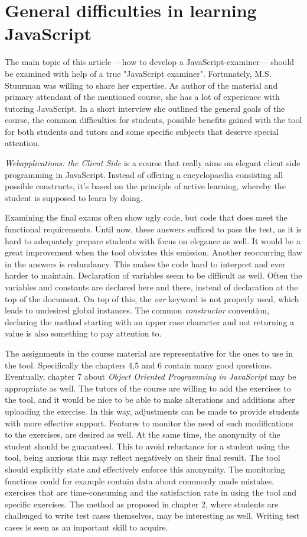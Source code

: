 \documentclass{article}
\begin{document}
\section{General difficulties in learning JavaScript} 
The main topic of this article ---how to develop a JavaScript-examiner--- should be 
examined with help of a true  "JavaScript examiner". Fortunately, 
M.S. Stuurman was willing to share her expertise. As author of the
material and primary attendant of the mentioned course, she has a lot of
experience with tutoring JavaScript.  In a short interview she outlined the
general goals of the course, the common difficulties for students, possible 
benefits gained with the tool for both students and tutors and some specific 
subjects that deserve special attention.


{\em Webapplications: the Client Side} is a course that really aims on elegant 
client side programming in JavaScript. Instead of offering a encyclopaedia
consisting all possible constructs, it's based on the principle of active
learning, whereby the student is supposed to learn by doing.


Examining the final exams often show ugly code, but code that does meet 
the functional requirements. Until now, these answers sufficed to pass the test,
as it is hard to adequately prepare students with focus on elegance as well. It
would be a great improvement when the tool obviates this emission. Another 
reoccurring flaw in the answers is redundancy. This makes the code hard
to interpret and ever harder to maintain. Declaration of variables seem to be
difficult as well. Often the variables and constants are declared here and 
there, instead of
declaration at the top of the document. On top of this, the {\em var} keyword 
is not properly used, which leads to undesired global instances. The common
{\em constructor} convention, declaring the method starting with an upper case
character and not returning a value is also something to pay attention to.


The assignments in the course material are representative for the ones to use 
in the tool. Specifically the chapters 4,5 and 6 contain many good questions. 
Eventually, chapter 7 about {\em Object Oriented Programming in JavaScript} may
be appropriate as well. 
The tutors of the course are willing to add the exercises to the tool, and it 
would be nice to be able to make alterations and additions after uploading the 
exercise. In this way, adjustments can be made to provide students with more
effective support. Features to monitor the need of such modifications to the 
exercises, are desired as well. At the same time, the anonymity of the student
should be guaranteed. This to avoid reluctance for a student using the tool, 
being anxious this may reflect negatively on their final result. The tool should
explicitly state and effectively enforce this anonymity. The monitoring
functions could for example contain data about commonly made mistakes,
exercises that are time-consuming and the satisfaction rate in using the tool
and specific exercises. The method as proposed in chapter 2, where students are
challenged to write test cases themselves, may be interesting as well. Writing
test cases is seen as an important skill to acquire. 
\end{document}
